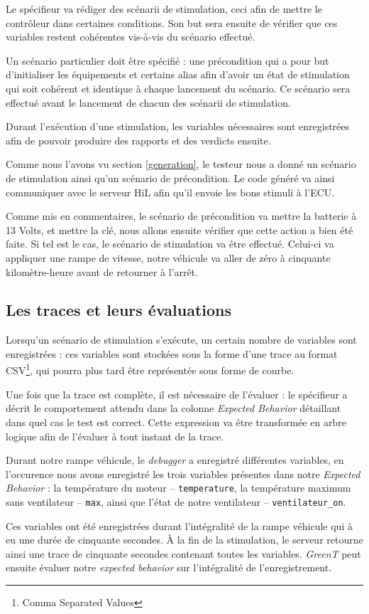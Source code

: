 Le spécifieur va rédiger des scénarii de stimulation, ceci afin de mettre le contrôleur dans certaines conditions. Son but sera ensuite de vérifier que ces variables restent cohérentes vis-à-vis du scénario effectué. 

Un scénario particulier doit être spécifié : une précondition qui a pour but d'initialiser les équipements et certains alias afin d'avoir un état de stimulation qui soit cohérent et identique à chaque lancement du scénario. Ce scénario sera effectué avant le lancement de chacun des scénarii de stimulation.

Durant l'exécution d'une stimulation, les variables nécessaires sont enregistrées afin de pouvoir produire des rapports et des
verdicts ensuite.
\begin{exemple}
	Comme nous l'avons vu section \ref{generation}, le testeur nous a donné un scénario de stimulation ainsi qu'un scénario de précondition. Le code généré va ainsi communiquer avec le serveur HiL afin qu'il envoie les bons stimuli à l'ECU.

	Comme mis en commentaires, le scénario de précondition va mettre la batterie à 13 Volts, et mettre la clé, nous allons ensuite vérifier que cette action a bien été faite. Si tel est le cas, le scénario de stimulation va être effectué. Celui-ci va appliquer une rampe de vitesse, notre véhicule va aller de zéro à cinquante kilomètre-heure avant de retourner à l'arrêt.	
\end{exemple}

\subsection{Les traces et leurs évaluations}\label{expectedBehavior}
Lorsqu'un scénario de stimulation s'exécute, un certain nombre de variables sont enregistrées : ces variables sont stockées sous la forme d'une trace au format CSV\footnote{Comma Separated Values}, qui pourra plus tard être représentée sous forme de courbe. 

Une fois que la trace est complète, il est nécessaire de l'évaluer : le spécifieur a décrit le comportement attendu dans la colonne \textit{Expected Behavior} détaillant dans quel cas le test est correct. Cette expression va être transformée en arbre logique afin de l'évaluer à tout instant de la trace. 

\begin{exemple}
	Durant notre rampe véhicule, le \textit{debugger} a enregistré différentes variables, en l'occurence nous avons enregistré les trois variables présentes dans notre \textit{Expected Behavior} : la température	du moteur -- \texttt{temperature}, la température maximum sans ventilateur -- \texttt{max}, ainsi que l'état de notre ventilateur -- \texttt{ventilateur\_on}.
	
	Ces variables ont été enregistrées durant l'intégralité de la rampe véhicule qui à eu une durée de cinquante secondes. À la fin de la stimulation, le serveur retourne ainsi une trace de cinquante secondes contenant toutes les variables. \textit{GreenT} peut ensuite évaluer notre \textit{expected behavior} sur l'intégralité de l'enregistrement.
\end{exemple}
